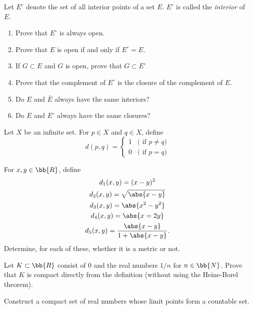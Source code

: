 \documentclass[12pt,letterpaper]{hmcpset}
\begin{document}
\begin{problem}[9.]
	Let $E^\circ$ denote the set of all interior points of a set $E$. $E^\circ$ is called the \textit{interior} of $E$.
	\begin{enumerate}
		\item Prove that $E^\circ$ is always open.
		\item Prove that $E$ is open if and only if $E^\circ = E$.
		\item If $G \subset E$ and $G$ is open, prove that $G \subset E^\circ$
		\item Prove that the complement of $E^\circ$ is the closure of the complement of $E$.
		\item Do $E$ and $\bar{E}$ always have the same interiors?
		\item Do $E$ and $E^\circ$ always have the same closures?
	\end{enumerate}
\end{problem}

\begin{problem}[10.]
	Let $X$ be an infinite set. For $p \in X$ and $q \in X$, define
	\[
		d(p, q) = \begin{cases}
			1 & \text{( if $p \neq q$)} \\
			0 & \text{( if $p = q$)}
		\end{cases}
	\]
\end{problem}

\begin{problem}[11.]
	For $x, y \in \bb{R}$, define
	\[
		\begin{gathered}
			d_1(x, y) = (x - y)^2 \\
			d_2(x, y) = \sqrt{\abs{x - y}} \\
			d_3(x, y) = \abs{x^2 - y^2} \\
			d_4(x, y) = \abs{x = 2y} \\
			d_5(x, y) = \frac{\abs{x - y}}{1 + \abs{x - y}}.
		\end{gathered}
	\]
	Determine, for each of these, whether it is a metric or not.
\end{problem}

\begin{problem}[12.]
	Let $K \subset \bb{R}$ consist of $0$ and the real numbers $1/n$ for $n \in \bb{N}$. Prove that $K$ is compact directly from the definition (without using the Heine-Borel theorem).
\end{problem}

\begin{problem}[13.]
	Construct a compact set of real numbers whose limit points form a countable set.
\end{problem}
\end{document}
